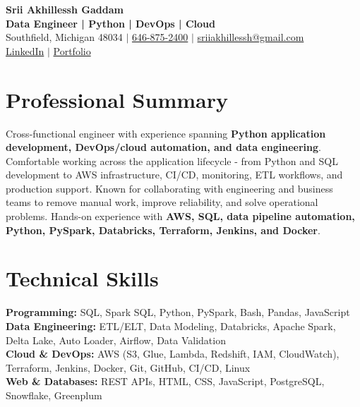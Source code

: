 \documentclass[letterpaper,10pt]{article}
\begin{document}
\fontsize{9.35pt}{10.45pt}\selectfont

\begin{center}
    {\LARGE \textbf{Srii Akhillessh Gaddam}} \\[-1pt]
    \textbf{Data Engineer | Python | DevOps | Cloud} \\[2pt]
    Southfield, Michigan 48034 $|$
    \href{tel:6468752400}{646-875-2400} $|$
    \href{mailto:sriiakhillessh@gmail.com}{sriiakhillessh@gmail.com} \\[1pt]
    \href{https://www.linkedin.com/in/srii-akhiilessh-gaddam-b48668191/}{LinkedIn} $|$
    \href{https://sriiakhillesshg.github.io/portfolio/}{Portfolio}
\end{center}
\vspace{-8pt}

\section{Professional Summary}
\small{Cross-functional engineer with experience spanning \textbf{Python application development, DevOps/cloud automation, and data engineering}. Comfortable working across the application lifecycle - from Python and SQL development to AWS infrastructure, CI/CD, monitoring, ETL workflows, and production support. Known for collaborating with engineering and business teams to remove manual work, improve reliability, and solve operational problems. Hands-on experience with \textbf{AWS, SQL, data pipeline automation, Python, PySpark, Databricks, Terraform, Jenkins, and Docker}.}

\section{Technical Skills}
\small{
\textbf{Programming:} SQL, Spark SQL, Python, PySpark, Bash, Pandas, JavaScript \\
\textbf{Data Engineering:} ETL/ELT, Data Modeling, Databricks, Apache Spark, Delta Lake, Auto Loader, Airflow, Data Validation \\
\textbf{Cloud \& DevOps:} AWS (S3, Glue, Lambda, Redshift, IAM, CloudWatch), Terraform, Jenkins, Docker, Git, GitHub, CI/CD, Linux \\
\textbf{Web \& Databases:} REST APIs, HTML, CSS, JavaScript, PostgreSQL, Snowflake, Greenplum
}

\end{document}
